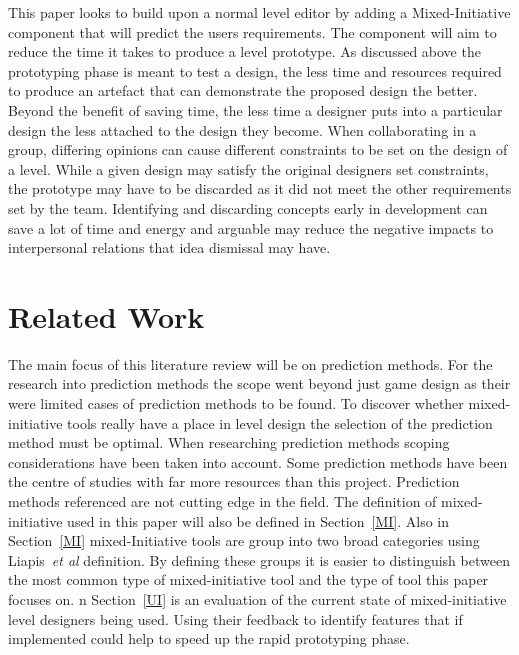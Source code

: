 \documentclass[journal]{IEEEtran}
\begin{document}
This paper looks to build upon  a normal level editor by adding a Mixed-Initiative component that will predict the users requirements. The component will aim to reduce the time it takes to produce a level prototype. As discussed above the prototyping phase is meant to test a design, the less time and resources required to produce an artefact that can demonstrate the proposed design the better. Beyond the benefit of saving time, the less time a designer puts into a particular design the less attached to the design they become. When collaborating in a group, differing opinions can cause different constraints to be set on the design of a level. While a given design may satisfy the original designers set constraints, the prototype may have to be discarded as it did not meet the other requirements set by the team. Identifying and discarding concepts early in development can save a lot of time and energy \cite[p.489]{stempfle1999thinking} and arguable may reduce the negative impacts to interpersonal relations that idea dismissal may have. 

\section{Related Work}
The main focus of this literature review will be on prediction methods. For the research into prediction methods the scope went beyond just game design as their were limited cases of prediction methods to be found. To discover whether mixed-initiative tools really have a place in level design the selection of the prediction method must be optimal. When researching prediction methods scoping considerations have been taken into account. Some prediction methods have been the centre of studies with far more resources than this project. Prediction methods referenced are not cutting edge in the field.  The definition of mixed-initiative used in this paper will also be defined in  Section~\ref{MI}.  Also in Section~\ref{MI} mixed-Initiative tools are group into two broad categories using Liapis~\textit{et al}\cite{liapis2016mixed} definition. By defining these groups it is easier to distinguish between the most common type of mixed-initiative tool and the type of tool this paper focuses on.  n Section~\ref{UI} is an evaluation of the current state of mixed-initiative level designers being used. Using their feedback to identify features that if implemented could help to speed up the rapid prototyping phase. 
\end{document}

